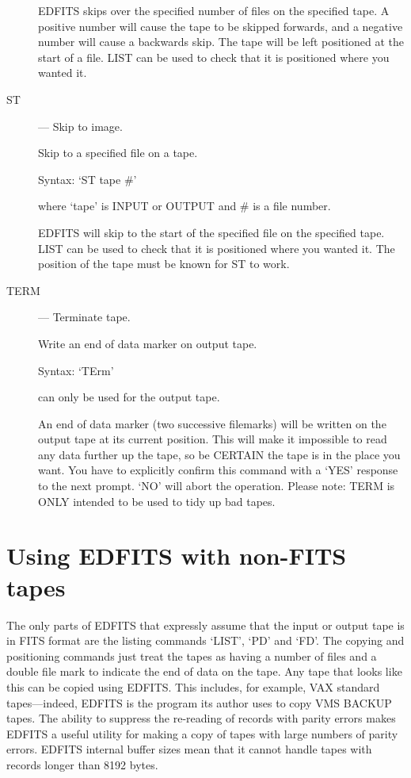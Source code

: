 \begin{description}
EDFITS skips over the specified number of files on the specified tape.
A positive number will cause the tape to be skipped forwards, and a
negative number will cause a backwards skip.  The tape will be left 
positioned at the start of a file.  LIST can be used to check that
it is positioned where you wanted it.

\item [ST] --- Skip to image.

Skip to a specified file on a tape.

Syntax:    `ST  tape  \#'      

where `tape' is INPUT or OUTPUT and \# is a file number.

EDFITS will skip to the start of the specified file on the specified
tape.  LIST can be used to check that it is positioned where you wanted
it.  The position of the tape must be known for ST to work.

\item [TERM] --- Terminate tape.

Write an end of data marker on output tape.

Syntax:   `TErm'            

can only be used for the output tape.

An end of data marker (two successive filemarks) will be written on the
output tape at its current position.  This will make it impossible to
read any data further up the tape, so be CERTAIN the tape is in the
place you want.    You have to explicitly confirm this command with a
`YES' response to the next prompt.  `NO' will abort the operation.
Please note: TERM is ONLY intended to be used to tidy up bad tapes.

\end{description}

\section{Using EDFITS with non-FITS tapes}

The only parts of EDFITS that expressly assume that the input or output
tape is in FITS format are the listing commands `LIST', `PD' and `FD'.
The copying and positioning commands just treat the tapes as having a
number of files and a double file mark to indicate the end of
data on the tape.  Any tape that looks like this can be copied using EDFITS.
This includes, for example, VAX standard tapes---indeed, EDFITS is the 
program its author uses to copy VMS BACKUP tapes.  The ability to suppress
the re-reading of records with parity errors makes EDFITS a useful utility
for making a copy of tapes with large numbers of parity errors.  EDFITS
internal buffer sizes mean that it cannot handle tapes with records longer
than 8192 bytes.

